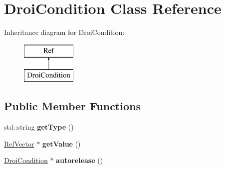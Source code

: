 \hypertarget{class_droi_condition}{}\section{Droi\+Condition Class Reference}
\label{class_droi_condition}
Inheritance diagram for Droi\+Condition\+:\begin{figure}[H]
\begin{center}
\leavevmode
\includegraphics[height=2.000000cm]{da/dd7/class_droi_condition}
\end{center}
\end{figure}
\subsection*{Public Member Functions}
\begin{DoxyCompactItemize}
\item 
\mbox{\label{class_droi_condition_ab16266133a672ad08460b20d09989016}} 
std\+::string {\bfseries get\+Type} ()
\item 
\mbox{\label{class_droi_condition_adbbb73972993fec554faa6db7daf8de2}} 
\hyperlink{class_ref_vector}{Ref\+Vector} $\ast$ {\bfseries get\+Value} ()
\item 
\mbox{\label{class_droi_condition_a7baa36eaf4ee422e0460c38f00c12af6}} 
\hyperlink{class_droi_condition}{Droi\+Condition} $\ast$ {\bfseries autorelease} ()
\end{DoxyCompactItemize}
